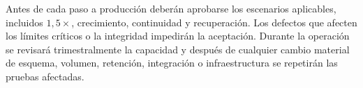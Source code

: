 Antes de cada paso a producción deberán aprobarse los escenarios aplicables, incluidos \(1{,}5\times\), crecimiento, continuidad y recuperación. Los defectos que afecten los límites críticos o la integridad impedirán la aceptación. Durante la operación se revisará trimestralmente la capacidad y después de cualquier cambio material de esquema, volumen, retención, integración o infraestructura se repetirán las pruebas afectadas.
